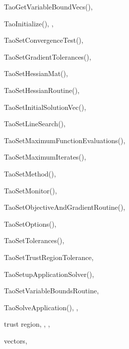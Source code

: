 \begin{theindex}
  \item TaoGetVariableBoundVecs(), 
  \item TaoInitialize(), , 
  \item TaoSetConvergenceTest(), 
  \item TaoSetGradientTolerances(), 
  \item TaoSetHessianMat(), 
  \item TaoSetHessianRoutine(), 
  \item TaoSetInitialSolutionVec(), 
  \item TaoSetLineSearch(), 
  \item TaoSetMaximumFunctionEvaluations(), 
  \item TaoSetMaximumIterates(), 
  \item TaoSetMethod(), 
  \item TaoSetMonitor(), 
  \item TaoSetObjectiveAndGradientRoutine(), 
  \item TaoSetOptions(), 
  \item TaoSetTolerances(), 
  \item TaoSetTrustRegionTolerance, 
  \item TaoSetupApplicationSolver(), 
  \item TaoSetVariableBoundsRoutine, 
  \item TaoSolveApplication(), , 
  \item trust region, , , 

  \indexspace

  \item vectors, 

\end{theindex}
